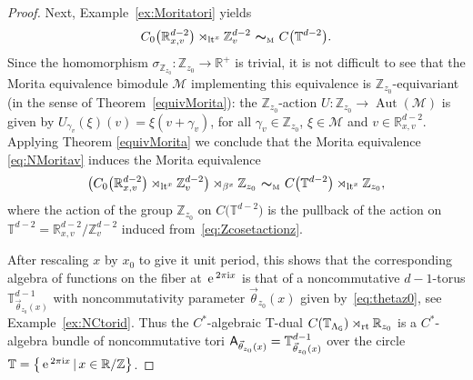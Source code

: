 \documentclass[pdftex]{sigma}
\numberwithin{equation}{section}
\newcommand{\Z}{\zed}
\newcommand{\mbf}[1]{{\boldsymbol {#1} }}
\def\ii{{{\rm i}}}
\def\A{{\sf A}}
\newcommand{\sfG}{\mathsf{G}}
\newcommand{\Aut}{\operatorname{Aut}}
\newcommand{\lt}{{\rm lt}}
\newcommand{\rt}{{\rm rt}}
\newcommand{\zed}{{\mathbb Z}} %
\newcommand{\real}{{\mathbb R}} %
\newcommand{\torus}{{\mathbb T}} %
\def\Mcal{{\mathcal M}}
\def\e{{\,\rm e}\,}
\begin{document}
\begin{proof}
Next, Example~\ref{ex:Moritatori} yields
\begin{gather}\label{eq:NMoritav}
C_0\big(\real_{x,v}^{d-2}\big)\rtimes_{\lt^x} \Z_{v}^{d-2} \ \mbf\sim_{\text{\tiny M}} \
C\big(\torus^{d-2}\big) .
\end{gather}
Since the homomorphism
$\sigma_{\Z_{ z_0}}\colon \Z_{ z_0}\to\real^+$ is trivial, it is not difficult to see
that the Morita equivalence bimodule $\Mcal$ implementing this
equivalence is $\Z_{ z_0}$-equivariant (in the sense of Theorem~\ref{equivMorita}):
the $\Z_{ z_0}$-action
$U\colon \Z_{ z_0}\rightarrow \Aut(\Mcal)$ is given by $U_{\gamma_v}(\xi)(v)=\xi(v+\gamma_v)$, for all $\gamma_v\in
\Z_{ z_0}$, $\xi\in \Mcal$ and $v\in \real_{x,v}^{d-2} $.
Applying Theorem \ref{equivMorita} we conclude that the
Morita equivalence \eqref{eq:NMoritav} induces the Morita equivalence
\begin{gather}\label{eq:fibreNCMostow}
\big(C_0\big(\real^{d-2}_{x,v}\big)\rtimes_{\lt^x}\Z^{d-2}_{v}\big) \rtimes_{\beta^x}
\Z_{ z_0} \ \mbf\sim_{\text{\tiny M}} \
C\big(\torus^{d-2}\big)\rtimes_{\lt^x}\Z_{ z_0} ,
\end{gather}
where the action
of the group $\Z_{ z_0}$ on $C\big(\torus^{d-2}\big)$ is the pullback of the action on
$\torus^{d-2}=\real_{x,v}^{d-2}/\Z_{v}^{d-2}$ induced
from~\eqref{eq:Zcosetactionz}.

After rescaling $x$ by $x_0$
to give it unit period, this shows that the
corresponding algebra of functions on the fiber at $\e^{2\pi\ii x}$ is that
of a noncommutative $d{-}1$-torus $\torus_{\vec\theta_{
 z_0}(x)}^{d-1}$ with noncommutativity parameter
$\vec\theta_{z_0}(x)$ given by~\eqref{eq:thetaz0}, see Example~\ref{ex:NCtorid}.
Thus the $C^*$-algebraic T-dual
$C(\torus_{\Lambda_\sfG})\rtimes_\rt\real_{ z_0}$ is a $C^*$-algebra bundle
of noncommutative tori $\A_{\vec\theta_{
 z_0}(x)}=\torus^{d-1}_{\vec\theta_{ z_0}(x)}$ over the
circle $\torus=\big\{\e^{2\pi\ii x}\, | \, x\in \real/\Z\big\}$.
\end{proof}
\end{document}
